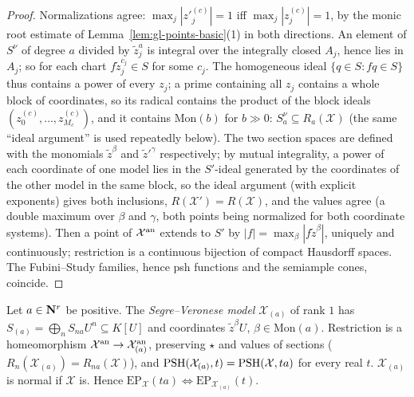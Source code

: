\begin{proof}
Normalizations agree: $\max_j|z'^{(c)}_j|=1$ iff $\max_j|z^{(c)}_j|=1$, by the monic root estimate of Lemma~\ref{lem:gl-points-basic}(1) in both
directions. An element of $S^\nu$ of degree $a$ divided by $\tilde z_j^a$ is integral over the integrally closed $A_j$, hence lies in $A_j$; so for each
chart $f\tilde z_j^{c_j}\in S$ for some $c_j$. The homogeneous ideal $\{q\in S:fq\in S\}$ thus contains a power of every $z_j$; a prime containing all $z_j$
contains a whole block of coordinates, so its radical contains the product of the block ideals $(z^{(c)}_0,\dots,z^{(c)}_{M_c})$, and it contains $\mathrm{Mon}(b)$ for
$b\gg0$: $S^\nu_a\subseteq R_a(\mathcal X)$ (the same ``ideal argument'' is used repeatedly below). The two section spaces are defined
with the monomials $\tilde z^\beta$ and $\tilde z'^\gamma$ respectively; by mutual integrality, a power of each coordinate of one model lies in
the $S'$-ideal generated by the coordinates of the other model in the same block, so the ideal argument (with explicit exponents) gives
both inclusions, $R(\mathcal X')=R(\mathcal X)$, and the values agree (a double maximum over $\beta$ and $\gamma$, both points being
normalized for both coordinate systems). Then a point of $\mathcal X^{\mathrm{an}}$ extends to $S'$ by $|f|=\max_\beta|f\tilde z^\beta|$, uniquely and continuously; restriction is a
continuous bijection of compact Hausdorff spaces. The Fubini--Study families, hence psh functions and the semiample cones, coincide.
\end{proof}

\begin{lemma}\label{lem:gl-veronese}
\leanok
{}
Let $a\in\mathbf{N}^r$ be positive. The \emph{Segre--Veronese model} $\mathcal X_{(a)}$ of rank $1$ has $S_{(a)}=\bigoplus_nS_{na}U^n\subseteq K[U]$ and
coordinates $\tilde z^\beta U$, $\beta\in\mathrm{Mon}(a)$. Restriction is a homeomorphism $\mathcal X^{\mathrm{an}}\to\mathcal X_{(a)}^{\mathrm{an}}$, preserving $\star$ and
values of sections ($R_n(\mathcal X_{(a)})=R_{na}(\mathcal X)$), and $\operatorname{PSH}(\mathcal X_{(a)},t)=\operatorname{PSH}(\mathcal X,ta)$ for every real $t$. $\mathcal X_{(a)}$ is
normal if $\mathcal X$ is. Hence $\mathrm{EP}_{\mathcal X}(ta)\iff\mathrm{EP}_{\mathcal X_{(a)}}(t)$.
\end{lemma}

